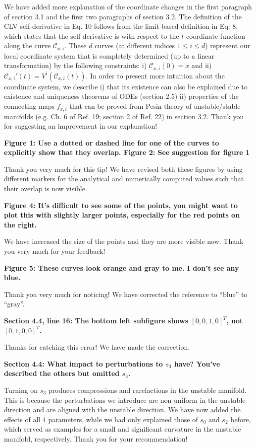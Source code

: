 \documentclass[11pt]{article}
\newcommand{\highlight}[1]{{\color{burgundy}\textbf{#1}}}
\begin{document}
We have added more explanation of the coordinate changes in the first paragraph of section 3.1 and the first two paragraphs of section 3.2.
The definition of the CLV self-derivative in Eq. 10 follows from the limit-based definition in Eq. 8, which states that the self-derivative is with respect to the $t$ coordinate function along the curve $\mathcal{C}_{x,i}$. These $d$ curves (at different indices $1\leq i\leq d$) represent our local coordinate system that is completely determined (up to a linear transformation) by the following constraints: i) $\mathcal{C}_{x,i}(0) = x$ and ii) $\mathcal{C}_{x,i}'(t) = V^i(\mathcal{C}_{x,i}(t)).$ In order to present more intuition about the coordinate system, we describe i) that its existence can also be explained due to existence and uniqueness theorems of ODEs (section 2.5) ii) properties of the connecting maps $f_{x,i}$ that can be proved from Pesin theory of unstable/stable manifolds (e.g. Ch. 6 of Ref. 19; section 2 of Ref. 22) in section 3.2.  
Thank you for suggesting an improvement in our explanation!

\highlight{Figure 1: Use a dotted or dashed line for one of the curves to explicitly show that they overlap.
Figure 2: See suggestion for figure 1}

Thank you very much for this tip! We have revised both these figures by using different markers for the analytical and numerically computed values such that their overlap is now visible. 

\highlight{Figure 4: It's difficult to see some of the points, you might want to plot this with slightly larger points, especially
for the red points on the right.}

We have increased the size of the points and they are more visible now. Thank you very much for your feedback! 

\highlight{Figure 5: These curves look orange and gray to me. I don't see any blue.}

Thank you very much for noticing! We have corrected the reference to ``blue'' to ``gray''.

\highlight{Section 4.4, line 16: The bottom left subfigure shows $[0,0,1,0]^T$, not $[0,1,0,0]^T$.}

Thanks for catching this error! We have made the correction.

\highlight{Section 4.4: What impact to perturbations to $s_3$ have? You've described the others but omitted $s_3$.}

Turning on $s_3$ produces compressions and rarefactions in the unstable manifold. This is because the perturbations we introduce are non-uniform in the unstable direction and are aligned with the unstable direction. We have now added the effects of all 4 parameters, while we had only explained those of $s_0$ and $s_2$ before, which served as examples for a small and significant curvature in the unstable manifold, respectively. Thank you for your recommendation!
\end{document}

